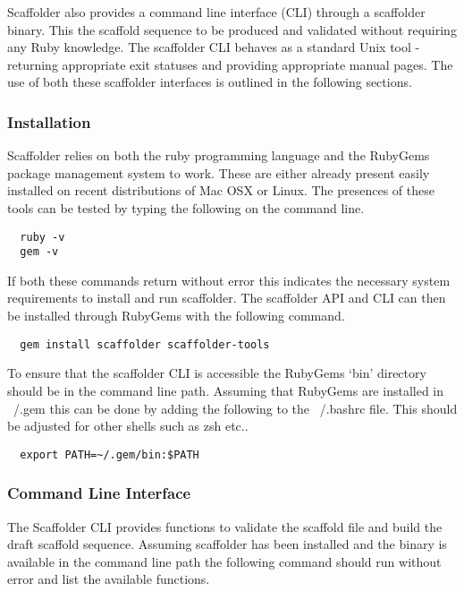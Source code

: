 \documentclass[10pt]{bmc_article}
\newenvironment{bmcformat}{\begin{raggedright}\baselineskip20pt\sloppy\setboolean{publ}{false}}{\end{raggedright}\baselineskip20pt\sloppy}
\begin{document}
\begin{bmcformat}
Scaffolder also provides a command line interface (CLI) through a scaffolder
binary. This the scaffold sequence to be produced and validated without
requiring any Ruby knowledge. The scaffolder CLI behaves as a standard Unix
tool - returning appropriate exit statuses and providing appropriate manual
pages. The use of both these scaffolder interfaces is outlined in the following
sections. \pb

\subsubsection*{Installation} %

Scaffolder relies on both the ruby programming language and the RubyGems
package management system to work. These are either already present easily
installed on recent distributions of Mac OSX or Linux. The presences of these
tools can be tested by typing the following on the command line. \pb

\begin{verbatim}
  ruby -v
  gem -v
\end{verbatim}

If both these commands return without error this indicates the necessary
system requirements to install and run scaffolder. The scaffolder API and CLI
can then be installed through RubyGems with the following command.

\begin{verbatim}
  gem install scaffolder scaffolder-tools
\end{verbatim}

To ensure that the scaffolder CLI is accessible the RubyGems `bin' directory
should be in the command line path. Assuming that RubyGems are installed in
~/.gem this can be done by adding the following to the ~/.bashrc file. This
should be adjusted for other shells such as zsh etc..

\begin{verbatim}
  export PATH=~/.gem/bin:$PATH
\end{verbatim}

\subsubsection*{Command Line Interface} %

The Scaffolder CLI provides functions to validate the scaffold file and build the draft scaffold sequence. Assuming scaffolder has been installed and the
binary is available in the command line path the following command should run without error and list the available functions. \pb


\end{bmcformat}
\end{document}
